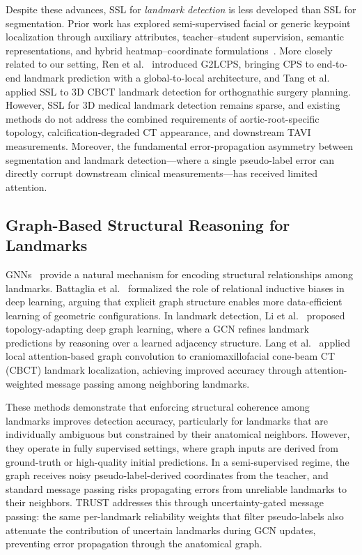 \documentclass[conference]{IEEEtran}
\begin{document}
Despite these advances, SSL for \emph{landmark detection} is less developed than SSL for segmentation. Prior work has explored semi-supervised facial or generic keypoint localization through auxiliary attributes, teacher--student supervision, semantic representations, and hybrid heatmap--coordinate formulations~\cite{Honari2018_ssl_landmarks,Dong2019_teacher_students,Moskvyak2021_ssl_keypoints,Kim2023_hybridmatch}. More closely related to our setting, Ren et al.~\cite{Ren2024_g2lcps} introduced G2LCPS, bringing CPS to end-to-end landmark prediction with a global-to-local architecture, and Tang et al.~\cite{Tang2025_cbct_ssl} applied SSL to 3D CBCT landmark detection for orthognathic surgery planning. However, SSL for 3D medical landmark detection remains sparse, and existing methods do not address the combined requirements of aortic-root-specific topology, calcification-degraded CT appearance, and downstream TAVI measurements. Moreover, the fundamental error-propagation asymmetry between segmentation and landmark detection---where a single pseudo-label error can directly corrupt downstream clinical measurements---has received limited attention.

\subsection{Graph-Based Structural Reasoning for Landmarks}
\label{sec:related_graph}

GNNs~\cite{Scarselli2009_gnn,Kipf2017_gcn} provide a natural mechanism for encoding structural relationships among landmarks. Battaglia et al.~\cite{Battaglia2018_relational_inductive} formalized the role of relational inductive biases in deep learning, arguing that explicit graph structure enables more data-efficient learning of geometric configurations. In landmark detection, Li et al.~\cite{Li2020_structured_landmark} proposed topology-adapting deep graph learning, where a GCN refines landmark predictions by reasoning over a learned adjacency structure. Lang et al.~\cite{Lang2020_gcn_landmark} applied local attention-based graph convolution to cranio\-maxillo\-facial cone-beam CT (CBCT) landmark localization, achieving improved accuracy through attention-weighted message passing among neighboring landmarks.

These methods demonstrate that enforcing structural coherence among landmarks improves detection accuracy, particularly for landmarks that are individually ambiguous but constrained by their anatomical neighbors. However, they operate in fully supervised settings, where graph inputs are derived from ground-truth or high-quality initial predictions. In a semi-supervised regime, the graph receives noisy pseudo-label-derived coordinates from the teacher, and standard message passing risks propagating errors from unreliable landmarks to their neighbors. TRUST addresses this through uncertainty-gated message passing: the same per-landmark reliability weights that filter pseudo-labels also attenuate the contribution of uncertain landmarks during GCN updates, preventing error propagation through the anatomical graph.
\end{document}
